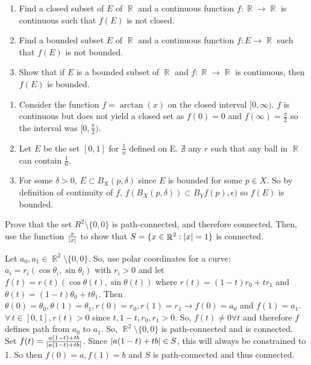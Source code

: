 \documentclass[12pt,letterpaper,boxed]{hmcpset}
\DeclareMathOperator{\R}{\mathbb{R}}
\DeclarePairedDelimiter\abs{\lvert}{\rvert}%
\begin{document}
\begin{problem}[Exercise 2.23]
\begin{enumerate}
    \itemsep0em
    \item Find a closed subset of $E$ of $\R$ and a continuous function $f: \R \rightarrow \R$ is continuous such that $f(E)$ is not closed.
    \item Find a bounded subset $E$ of $\R$ and a continuous function $f : E \rightarrow \R$ such that $f(E)$ is not bounded.
    \item Show that if $E$ is a bounded subset of $\R$ and $f: \R \rightarrow \R$ is continuous, then $f(E)$ is bounded.
\end{enumerate} 
\end{problem}

\begin{solution}
\begin{enumerate}
    \itemsep0em
    \item Consider the function $f = \arctan(x)$ on the closed interval $[0, \infty)$. $f$ is continuous but does not yield a closed set as $f(0)=0$ and $f(\infty)=\frac{\pi}{2}$ so the interval was $[0, \frac{\pi}{2})$.
    \item Let $E$ be the set $[0, 1]$ for $\frac{1}{x}$ defined on E. $\nexists$ any $r$ such that any ball in $\R$ can contain $\frac{1}{0}$.
    \item For some $\delta > 0$, $E\subset B_X(p, \delta)$ since $E$ is bounded for some $p\in X$. So by definition of continuity of $f$, $f(B_X(p, \delta))\subset B_Yf(p), \epsilon)$ so $f(E)$ is bounded.
\end{enumerate} 
\end{solution}

\begin{problem}[Exercise 2.32]
Prove that the set $R^{2}\setminus\{0,0\}$ is path-connected, and therefore connected. Then, use the function $\frac{x}{\abs{x}}$ to show that $S = \{x\in\R^{2}:\abs{x} = 1\}$ is connected.
\end{problem}

\begin{solution}
Let $a_0, a_1 \in \R^{2}\setminus\{0,0\}$. So, use polar coordinates for a curve: $a_i = r_i(\cos \theta_i, \sin \theta_i)$ with $r_i > 0$ and let $f(t) = r(t)(\cos \theta(t), \sin \theta(t))$ where $r(t) = (1 - t)r_0 + tr_1$ and $\theta(t)=(1-t)\theta_0 + t\theta_1$.
Then $\theta(0) = \theta_0, \theta(1)=\theta_1, r(0) = r_0, r(1)=r_1 \rightarrow f(0)=a_0$ and $f(1) = a_1$. $\forall \, t\in [0,1], r(t) > 0$ since $t, 1-t, r_0, r_1 > 0$. So, $f(t)\neq 0 \forall t$ and therefore $f$ defines path from $a_0$ to $a_1$. So, $\R^{2}\setminus\{0,0\}$ is path-connected and is connected. \\
Set $f(t)= \frac{a(1 - t) + tb}{\abs{a(1 - t) + tb}}$. Since $\abs{a(1 - t) + tb} \in S$, this will always be constrained to 1. So then $f(0) = a, f(1) = b$ and $S$ is path-connected and thus connected.
\end{solution}
\end{document}
